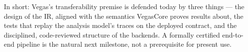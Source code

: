 In short: Vegas's transferability premise is defended today by
three things --- the design of the IR, aligned with the semantics
VegasCore proves results about, the tests that replay the analysis
model's traces on the deployed contract, and the disciplined,
code-reviewed structure of the backends.  A
formally certified end-to-end pipeline is the natural next
milestone, not a prerequisite for present use.
